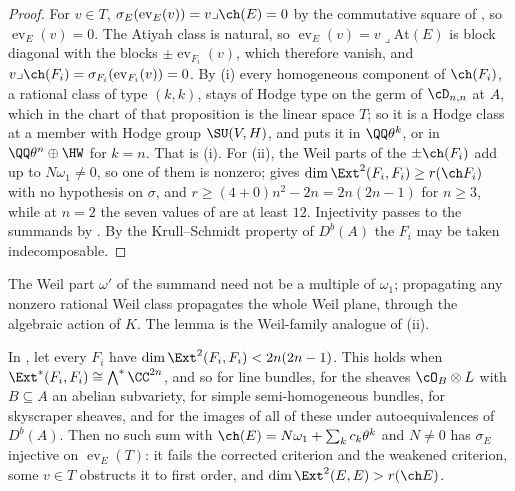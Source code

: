 \begin{proof}
For $v\in T$, $\sigma_{E}(\operatorname{ev}_{E}(v))=v\lrcorner\ch(E)=0$ by the
commutative square of , so $\operatorname{ev}_{E}(v)=0$.
The Atiyah class is natural, so $\operatorname{ev}_{E}(v)=v\lrcorner
\mathrm{At}(E)$ is block diagonal with the blocks $\pm\operatorname{ev}_{F_{i}}(v)$,
which therefore vanish, and $v\lrcorner\ch(F_{i})=\sigma_{F_{i}}
(\operatorname{ev}_{F_{i}}(v))=0$. By (i) every
homogeneous component of $\ch(F_{i})$, a rational class of type $(k,k)$, stays
of Hodge type on the germ of $\cD_{n,n}$ at $A$, which in the chart of that
proposition is the linear space $T$; so it is a Hodge class at a member with
Hodge group $\SU(V,H)$, and  puts it in $\QQ\theta^{k}$, or
in $\QQ\theta^{n}\oplus\HW$ for $k=n$. That is (i). For (ii), the Weil parts
of the $\pm\ch(F_{i})$ add up to $N\omega_{1}\ne0$, so one of them is nonzero;
 gives $\dim\Ext^{2}(F_{i},F_{i})\ge r(\ch F_{i})$ with
no hypothesis on $\sigma$, and $r\ge(4+0)n^{2}-2n=2n(2n-1)$ for $n\ge3$, while
at $n=2$ the seven values of  are at least $12$. Injectivity
passes to the summands by . By the Krull--Schmidt property
of $D^{b}(A)$ the $F_{i}$ may be taken indecomposable.
\end{proof}

The Weil part $\omega'$ of the summand need not be a multiple of $\omega_{1}$;
propagating any nonzero rational Weil class propagates the whole Weil plane,
through the algebraic action of $K$. The lemma is the Weil-family analogue of
(ii).

\begin{corollary}
\label{cor:naturalsums}
In , let every $F_{i}$ have
$\dim\Ext^{2}(F_{i},F_{i})<2n(2n-1)$. This holds when
$\Ext^{*}(F_{i},F_{i})\cong\bigwedge^{*}\CC^{2n}$, and so for line bundles, for
the sheaves $\cO_{B}\otimes L$ with $B\subseteq A$ an abelian subvariety, for
simple semi-homogeneous bundles, for skyscraper sheaves, and for the images of
all of these under autoequivalences of $D^{b}(A)$. Then no such sum with
$\ch(E)=N\omega_{1}+\sum_{k}c_{k}\theta^{k}$ and $N\ne0$ has $\sigma_{E}$
injective on $\operatorname{ev}_{E}(T)$: it fails the corrected criterion and
the weakened criterion, some $v\in T$ obstructs it to first order, and
$\dim\Ext^{2}(E,E)>r(\ch E)$.
\end{corollary}

